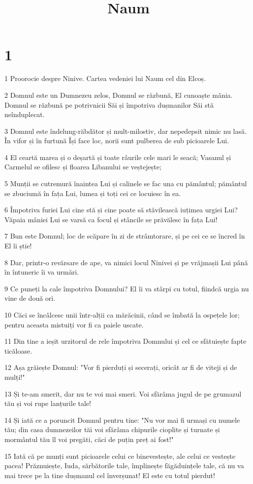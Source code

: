 

\title{Naum}


\chapter{1}

\par 1 Proorocie despre Ninive. Cartea vedeniei lui Naum cel din Elcoș.
\par 2 Domnul este un Dumnezeu zelos, Domnul se răzbună, El cunoaște mânia. Domnul se răzbună pe potrivnicii Săi și împotriva dușmanilor Săi stă neînduplecat.
\par 3 Domnul este îndelung-răbdător și mult-milostiv, dar nepedepsit nimic nu lasă. În vifor și în furtună Își face loc, norii sunt pulberea de sub picioarele Lui.
\par 4 El ceartă marea și o deșartă și toate râurile cele mari le seacă; Vasanul și Carmelul se ofilesc și floarea Libanului se veștejește;
\par 5 Munții se cutremură înaintea Lui și calinele se fac una cu pământul; pământul se zbuciumă în fața Lui, lumea și toți cei ce locuiesc în ea.
\par 6 Împotriva furiei Lui cine stă și cine poate să stăvilească iuțimea urgiei Lui? Văpaia mâniei Lui se varsă ca focul și stâncile se prăvălesc în fața Lui!
\par 7 Bun este Domnul; loc de scăpare în zi de strâmtorare, și pe cei ce se încred în El îi știe!
\par 8 Dar, printr-o revărsare de ape, va nimici locul Ninivei și pe vrăjmașii Lui până în întuneric îi va urmări.
\par 9 Ce puneți la cale împotriva Domnului? El îi va stârpi cu totul, fiindcă urgia nu vine de două ori.
\par 10 Căci se încâlcesc unii într-alții ca mărăcinii, când se îmbată la ospețele lor; pentru aceasta mistuiți vor fi ca paiele uscate.
\par 11 Din tine a ieșit urzitorul de rele împotriva Domnului și cel ce sfătuiește fapte ticăloase.
\par 12 Așa grăiește Domnul: "Vor fi pierduți și secerați, oricât ar fi de viteji și de mulți!"
\par 13 Și te-am smerit, dar nu te voi mai smeri. Voi sfărâma jugul de pe grumazul tău și voi rupe lanțurile tale!
\par 14 Și iată ce a poruncit Domnul pentru tine: "Nu vor mai fi urmași cu numele tău; din casa dumnezeilor tăi voi sfărâma chipurile cioplite și turnate și mormântul tău îl voi pregăti, căci de puțin preț ai fost!"
\par 15 Iată că pe munți sunt picioarele celui ce binevestește, ale celui ce vestește pacea! Prăznuiește, Iuda, sărbătorile tale, împlinește făgăduințele tale, că nu va mai trece pe la tine dușmanul cel înverșunat! El este cu totul pierdut!

